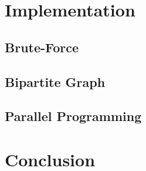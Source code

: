 \documentclass[condensed]{union-cs-thesis}
\begin{document}
\chapter{Implementation}
\label{sec:implementation}



\section{Brute-Force}


\section{Bipartite Graph}
\label{sec:bipartite_graph_implementation}




\section{Parallel Programming}


\chapter{Conclusion}





\end{document}
